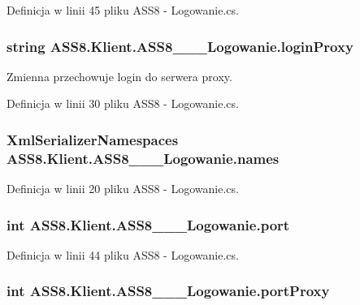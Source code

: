 Definicja w linii 45 pliku ASS8 - Logowanie.cs.\hypertarget{a00001_64ace6acc4b86f34c4744c5bbc55c8d2}{
\subsubsection[{loginProxy}]{\setlength{\rightskip}{0pt plus 5cm}string {\bf ASS8.Klient.ASS8\_\-\_\-\_\-Logowanie.loginProxy}}}
\label{d8/d84/a00001_64ace6acc4b86f34c4744c5bbc55c8d2}


Zmienna przechowuje login do serwera proxy. 



Definicja w linii 30 pliku ASS8 - Logowanie.cs.\hypertarget{a00001_72191f0c6adc5e4a4e11b9dd88c29487}{
\subsubsection[{names}]{\setlength{\rightskip}{0pt plus 5cm}XmlSerializerNamespaces {\bf ASS8.Klient.ASS8\_\-\_\-\_\-Logowanie.names}}}
\label{d8/d84/a00001_72191f0c6adc5e4a4e11b9dd88c29487}




Definicja w linii 20 pliku ASS8 - Logowanie.cs.\hypertarget{a00001_48becc1fc376804e26b24d008e8eb146}{
\subsubsection[{port}]{\setlength{\rightskip}{0pt plus 5cm}int {\bf ASS8.Klient.ASS8\_\-\_\-\_\-Logowanie.port}}}
\label{d8/d84/a00001_48becc1fc376804e26b24d008e8eb146}




Definicja w linii 44 pliku ASS8 - Logowanie.cs.\hypertarget{a00001_98d2c01bd53d8e03e93e3ec3e36cc8a8}{
\subsubsection[{portProxy}]{\setlength{\rightskip}{0pt plus 5cm}int {\bf ASS8.Klient.ASS8\_\-\_\-\_\-Logowanie.portProxy}}}
\label{d8/d84/a00001_98d2c01bd53d8e03e93e3ec3e36cc8a8}


